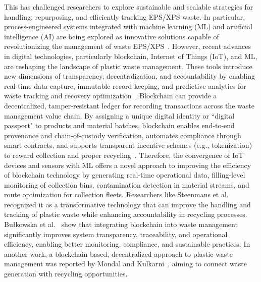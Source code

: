 \documentclass[final,5p,times,twocolumn]{elsarticle}
\begin{document}
This has challenged researchers to explore sustainable and scalable strategies for handling, repurposing, and efficiently tracking EPS/XPS waste. In particular, process-engineered systems integrated with machine learning (ML) and artificial intelligence (AI) are being explored as innovative solutions capable of revolutionizing the management of waste EPS/XPS~\cite{suchek2021innovation}. However, recent advances in digital technologies, particularly blockchain, Internet of Things (IoT), and ML, are reshaping the landscape of plastic waste management. These tools introduce new dimensions of transparency, decentralization, and accountability by enabling real-time data capture, immutable record-keeping, and predictive analytics for waste tracking and recovery optimization~\cite{bianchini2019overcoming}. Blockchain can provide a decentralized, tamper-resistant ledger for recording transactions across the waste management value chain. By assigning a unique digital identity or ``digital passport" to products and material batches, blockchain enables end-to-end provenance and chain-of-custody verification, automates compliance through smart contracts, and supports transparent incentive schemes (e.g., tokenization) to reward collection and proper recycling~\cite{bulkowska2024blockchain}. Therefore, the convergence of IoT devices and sensors with ML offers a novel approach to improving the efficiency of blockchain technology by generating real-time operational data, filling-level monitoring of collection bins, contamination detection in material streams, and route optimization for collection fleets. Researchers like Steenmans et al.~\cite{steenmans2021blockchain} recognized it as a transformative technology that can improve the handling and tracking of plastic waste while enhancing accountability in recycling processes. Bułkowska et al.~\cite{bulkowska2023implementation} show that integrating blockchain into waste management significantly improves system transparency, traceability, and operational efficiency, enabling better monitoring, compliance, and sustainable practices. In another work, a blockchain-based, decentralized approach to plastic waste management was reported by Mondal and Kulkarni~\cite{mondal2022blockchainb}, aiming to connect waste generation with recycling opportunities. 
\end{document}
